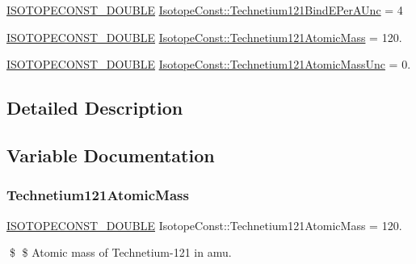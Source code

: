 \begin{DoxyCompactItemize}
\mbox{\hyperlink{group___isotope_const-_macros_ga8f45a7272ce02c0b4c65c44636ed719a}{I\+S\+O\+T\+O\+P\+E\+C\+O\+N\+S\+T\+\_\+\+D\+O\+U\+B\+LE}} \mbox{\hyperlink{group___isotope_const-_technetium-_tc121_gaee218535d117d01711082ef20d7131f5}{Isotope\+Const\+::\+Technetium121\+Bind\+E\+Per\+A\+Unc}} = 4
\item 
\mbox{\hyperlink{group___isotope_const-_macros_ga8f45a7272ce02c0b4c65c44636ed719a}{I\+S\+O\+T\+O\+P\+E\+C\+O\+N\+S\+T\+\_\+\+D\+O\+U\+B\+LE}} \mbox{\hyperlink{group___isotope_const-_technetium-_tc121_ga1fff55d226039a382222c790be4d6021}{Isotope\+Const\+::\+Technetium121\+Atomic\+Mass}} = 120.
\item 
\mbox{\hyperlink{group___isotope_const-_macros_ga8f45a7272ce02c0b4c65c44636ed719a}{I\+S\+O\+T\+O\+P\+E\+C\+O\+N\+S\+T\+\_\+\+D\+O\+U\+B\+LE}} \mbox{\hyperlink{group___isotope_const-_technetium-_tc121_ga2f9c539ad571adb8968e026f2f892281}{Isotope\+Const\+::\+Technetium121\+Atomic\+Mass\+Unc}} = 0.
\end{DoxyCompactItemize}


\subsection{Detailed Description}


\subsection{Variable Documentation}
\mbox{\label{group___isotope_const-_technetium-_tc121_ga1fff55d226039a382222c790be4d6021}} 
\subsubsection{\texorpdfstring{Technetium121\+Atomic\+Mass}{Technetium121AtomicMass}}
{\footnotesize\ttfamily \mbox{\hyperlink{group___isotope_const-_macros_ga8f45a7272ce02c0b4c65c44636ed719a}{I\+S\+O\+T\+O\+P\+E\+C\+O\+N\+S\+T\+\_\+\+D\+O\+U\+B\+LE}} Isotope\+Const\+::\+Technetium121\+Atomic\+Mass = 120.}

\$ \$ Atomic mass of Technetium-\/121 in amu. \mbox{\label{group___isotope_const-_technetium-_tc121_ga2f9c539ad571adb8968e026f2f892281}} 
